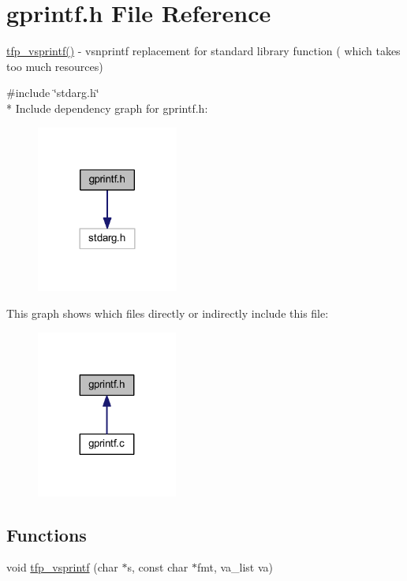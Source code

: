 \hypertarget{a00044}{\section{gprintf.\+h File Reference}
\label{a00044}
}


\hyperlink{a00044_aa8dfc5ac91747032198002a008a6aa46}{tfp\+\_\+vsprintf()} -\/ vsnprintf replacement for standard library function ( which takes too much resources)  


{\ttfamily \#include \char`\"{}stdarg.\+h\char`\"{}}\\*
Include dependency graph for gprintf.\+h\+:\nopagebreak
\begin{figure}[H]
\begin{center}
\leavevmode
\includegraphics[width=132pt]{d0/d85/a00908}
\end{center}
\end{figure}
This graph shows which files directly or indirectly include this file\+:\nopagebreak
\begin{figure}[H]
\begin{center}
\leavevmode
\includegraphics[width=131pt]{de/dc3/a00909}
\end{center}
\end{figure}
\subsection*{Functions}
\begin{DoxyCompactItemize}
\item 
void \hyperlink{a00044_aa8dfc5ac91747032198002a008a6aa46}{tfp\+\_\+vsprintf} (char $\ast$s, const char $\ast$fmt, va\+\_\+list va)
\end{DoxyCompactItemize}


